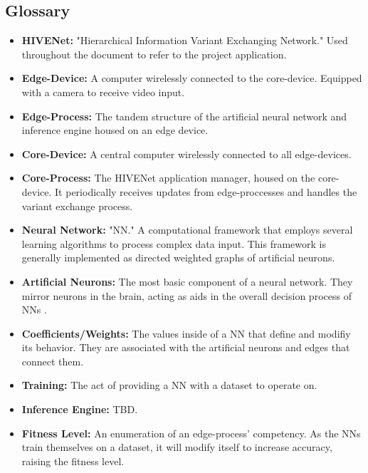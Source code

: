 \documentclass[onecolumn, draftclsnofoot,10pt, compsoc]{IEEEtran}
\begin{document}
	\subsection{Glossary}
		\begin{itemize}
			\item \textbf{HIVENet: }
"Hierarchical Information Variant Exchanging Network." 
Used throughout the document to refer to the project application.

			\item \textbf{Edge-Device: }
A computer wirelessly connected to the core-device.
Equipped with a camera to receive video input.

			\item \textbf{Edge-Process: }
The tandem structure of the artificial neural network and inference engine housed on an edge device.

			\item \textbf{Core-Device: }
A central computer wirelessly connected to all edge-devices.

			\item \textbf{Core-Process: }
The HIVENet application manager, housed on the core-device.
It periodically receives updates from edge-proccesses and handles the variant exchange process.

			\item \textbf{Neural Network: }
"NN."
A computational framework that employs several learning algorithms to process complex data input.
This framework is generally implemented as directed weighted graphs of artificial neurons.

			\item \textbf{Artificial Neurons: } 
The most basic component of a neural network.
They mirror neurons in the brain, acting as aids in the overall decision process of NNs \cite{glossary_one}.

			\item \textbf{Coefficients/Weights: }
The values inside of a NN that define and modifiy its behavior.
They are associated with the artificial neurons and edges that connect them.

			\item \textbf{Training: }
The act of providing a NN with a dataset to operate on.

			\item \textbf{Inference Engine: }
TBD.

			\item \textbf{Fitness Level: }	
An enumeration of an edge-process' competency.
As the NNs train themselves on a dataset, it will modify itself to increase accuracy, raising the fitness level.
		\end{itemize}
\end{document}
